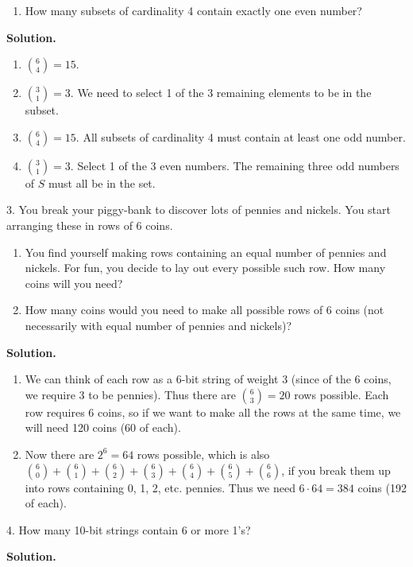 \documentclass[10pt,]{book}
\theoremstyle{plain}
\theoremstyle{definition}
\theoremstyle{definition}
\theoremstyle{definition}
\numberwithin{equation}{section}
\begin{document}
\begin{exerciselist}
\begin{enumerate}[label=(\alph*)]
\item\hypertarget{li-435}{} How many subsets of cardinality 4 contain exactly one even number? %
\end{enumerate}
\par\smallskip
\par\smallskip
\noindent\textbf{Solution.}\hypertarget{solution-77}{}\quad
\leavevmode%
\begin{enumerate}[label=(\alph*)]
\item\hypertarget{li-436}{}\({6\choose 4} = 15\).%
\item\hypertarget{li-437}{}\({3 \choose 1} = 3\).  We need to select 1 of the 3 remaining elements to be in the subset.%
\item\hypertarget{li-438}{}\({6 \choose 4} = 15\).  All subsets of cardinality 4 must contain at least one odd number.%
\item\hypertarget{li-439}{}\({3 \choose 1} = 3\).  Select 1 of the 3 even numbers.  The remaining three odd numbers of \(S\) must all be in the set.%
\end{enumerate}
\item[3.]\hypertarget{exercise-52}{}
            You break your piggy-bank to discover lots of pennies and nickels. You start arranging these in rows of 6 coins.
\leavevmode%
\begin{enumerate}[label=(\alph*)]
\item\hypertarget{li-440}{} You find yourself making rows containing an equal number of pennies and nickels.  For fun, you decide to lay out every possible such row.  How many coins will you need? %
\item\hypertarget{li-441}{} How many coins would you need to make all possible rows of 6 coins (not necessarily with equal number of pennies and nickels)? %
\end{enumerate}
\par\smallskip
\par\smallskip
\noindent\textbf{Solution.}\hypertarget{solution-78}{}\quad
\leavevmode%
\begin{enumerate}[label=(\alph*)]
\item\hypertarget{li-442}{} We can think of each row as a 6-bit string of weight 3 (since of the 6 coins, we require 3 to be pennies).  Thus there are \({6 \choose 3} = 20\) rows possible.  Each row requires 6 coins, so if we want to make all the rows at the same time, we will need 120 coins (60 of each). %
\item\hypertarget{li-443}{} Now there are \(2^6 = 64\) rows possible, which is also \({6 \choose 0} + {6\choose 1} + {6 \choose 2} + {6 \choose 3} + {6 \choose 4} + {6 \choose 5} + {6 \choose 6}\), if you break them up into rows containing 0, 1, 2, etc. pennies.  Thus we need \(6 \cdot 64 = 384\) coins (192 of each). %
\end{enumerate}
\item[4.]\hypertarget{exercise-53}{}
            How many 10-bit strings contain 6 or more 1's?
\par\smallskip
\par\smallskip
\noindent\textbf{Solution.}\hypertarget{solution-79}{}\quad


\end{exerciselist}
\end{document}

